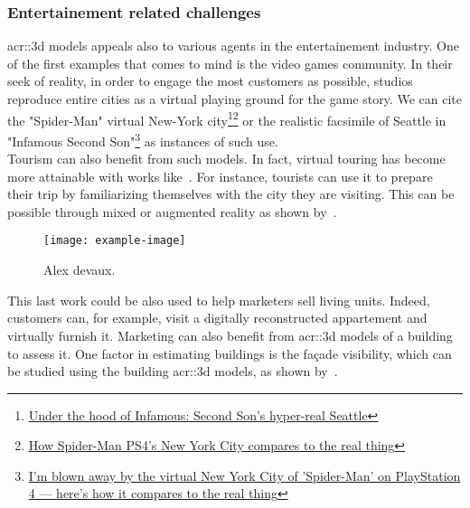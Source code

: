         \subsubsection{Entertainement related challenges}
            \gls{acr::3d} models appeals also to various agents in the entertainement industry. 
            One of the first examples that comes to mind is the video games community. 
            In their seek of reality, in order to engage the most customers as possible, studios reproduce entire cities as a virtual playing ground for the game story. 
            We can cite the "Spider-Man" virtual New-York city\footnote{
                \href{https://www.polygon.com/2013/9/25/4702318/under-the-hood-of-infamous-second-son-hyper-real-seattle}{Under the hood of Infamous: Second Son's hyper-real Seattle}
            }\footnote{
                \href{https://www.polygon.com/e3/2018/6/12/17453588/spider-man-ps4-new-york-city-avengers-demo-preview}{How Spider-Man PS4’s New York City compares to the real thing}
            } or the realistic facsimile of Seattle in "Infamous Second Son"\footnote{
                \href{http://www.businessinsider.fr/us/spider-man-ps4-new-york-city-2018-9}{I'm blown away by the virtual New York City of 'Spider-Man' on PlayStation 4 — here's how it compares to the real thing}
            } as instances of such use.\\
            Tourism can also benefit from such models. 
            In fact, virtual touring has become more attainable with works like~\textcite{koutsoudis20073d}. 
            For instance, tourists can use it to prepare their trip by familiarizing themselves with the city they are visiting. 
            This can be possible through mixed or augmented reality as shown by~\textcite{devaux20183d}.\\
            \begin{figure}[h]
                \centering
                \texttt{[image: example-image]}             
                \caption{
                    \label{fig::augemented_reality} Alex devaux. 
                }
            \end{figure}
            This last work could be also used to help marketers sell living units. 
            Indeed, customers can, for example, visit a digitally reconstructed appartement and virtually furnish it. 
            Marketing can also benefit from \gls{acr::3d} models of a building to assess it. 
            One factor in estimating buildings is the fa\c{c}ade visibility, which can be studied using the building \gls{acr::3d} models, as shown by~\textcite{albrecht2013assessing}. 

